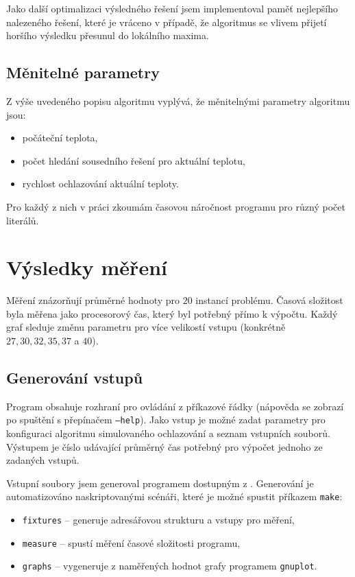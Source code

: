 \documentclass[czech]{article}
\begin{document}
Jako další optimalizaci výsledného řešení jsem implementoval paměť nejlepšího nalezeného řešení, které je vráceno v případě, že algoritmus se vlivem přijetí horšího výsledku přesunul do lokálního maxima.

\subsection*{Měnitelné parametry}

Z výše uvedeného popisu algoritmu vyplývá, že měnitelnými parametry algoritmu jsou:

\begin{itemize}
    \item počáteční teplota,
    \item počet hledání sousedního řešení pro aktuální teplotu,
    \item rychlost ochlazování aktuální teploty.
\end{itemize}

Pro každý z nich v práci zkoumám časovou náročnost programu pro různý počet literálů.

\section{Výsledky měření}

Měření znázorňují průměrné hodnoty pro $20$ instancí problému.
Časová složitost byla měřena jako procesorový čas, který byl potřebný přímo k výpočtu.
Každý graf sleduje změnu parametru pro více velikostí vstupu (konkrétně $27, 30, 32, 35, 37$ a $40$).

\subsection{Generování vstupů}

Program obsahuje rozhraní pro ovládání z příkazové řádky (nápověda se zobrazí po spuštění s přepínačem \texttt{--help}).
Jako vstup je možné zadat parametry pro konfiguraci algoritmu simulovaného ochlazování a seznam vstupních souborů.
Výstupem je číslo udávající průměrný čas potřebný pro výpočet jednoho ze zadaných vstupů.

Vstupní soubory jsem generoval programem dostupným z \cite{fw-gen}.
Generování je automatizováno naskriptovanými scénáři, které je možné spustit příkazem \texttt{make}:

\begin{itemize}
    \item \texttt{fixtures} -- generuje adresářovou strukturu a vstupy pro měření,
    \item \texttt{measure} -- spustí měření časové složitosti programu,
    \item \texttt{graphs} -- vygeneruje z naměřených hodnot grafy programem \texttt{gnuplot}.
\end{itemize}
\end{document}
